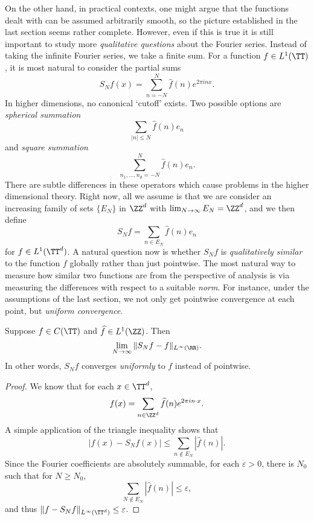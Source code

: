 On the other hand, in practical contexts, one might argue that the functions dealt with can be assumed arbitrarily smooth, so the picture established in the last section seems rather complete. However, even if this is true it is still important to study more \emph{qualitative questions} about the Fourier series. Instead of taking the infinite Fourier series, we take a finite sum. For a function $f \in L^1(\TT)$, it is most natural to consider the partial sums
%
\[ S_N f(x) = \sum_{n = -N}^N \widehat{f}(n) e^{2 \pi i n x}. \]
%
In higher dimensions, no canonical `cutoff' exists. Two possible options are \emph{spherical summation}
%
\[ \sum_{|n| \leq N} \widehat{f}(n) e_n \]
%
and \emph{square summation}
%
\[ \sum_{n_1, \dots, n_d = -N}^N \widehat{f}(n) e_n. \]
%
There are subtle differences in these operators which cause problems in the higher dimensional theory. Right now, all we assume is that we are consider an increasing family of sets $\{ E_N \}$ in $\ZZ^d$ with $\lim_{N \to \infty} E_N = \ZZ^d$, and we then define
%
\[ S_N f = \sum_{n \in E_N} \widehat{f}(n) e_n \]
%
for $f \in L^1(\TT^d)$. A natural question now is whether $S_N f$ is \emph{qualitatively similar} to the function $f$ globally rather than just pointwise. The most natural way to measure how similar two functions are from the perspective of analysis is via measuring the differences with respect to a suitable \emph{norm}. For instance, under the assumptions of the last section, we not only get pointwise convergence at each point, but \emph{uniform convergence}.


\begin{theorem}
    Suppose $f \in C(\TT)$ and $\widehat{f} \in L^1(\ZZ)$. Then
    \[ \lim_{N \to \infty} \| S_N f - f \|_{L^\infty(\RR)}. \]
    In other words, $S_N f$ converges \emph{uniformly} to $f$ instead of pointwise.
\end{theorem}
\begin{proof}
    We know that for each $x \in \TT^d$,
    \[ f(x) = \sum_{n \in \ZZ^d} \widehat{f}(n) e^{2 \pi i n \cdot x}. \]
    A simple application of the triangle inequality shows that
    \[ |f(x) - S_N f(x)| \leq \sum_{n \not \in E_N} |\widehat{f}(n)|. \]
    Since the Fourier coefficients are absolutely summable, for each $\varepsilon > 0$, there is $N_0$ such that for $N \geq N_0$,
    \[ \sum_{N \not \in E_N} |\widehat{f}(n)| \leq \varepsilon, \]
    and thus $\| f - S_N f \|_{L^\infty(\TT^d)} \leq \varepsilon$.
\end{proof}

